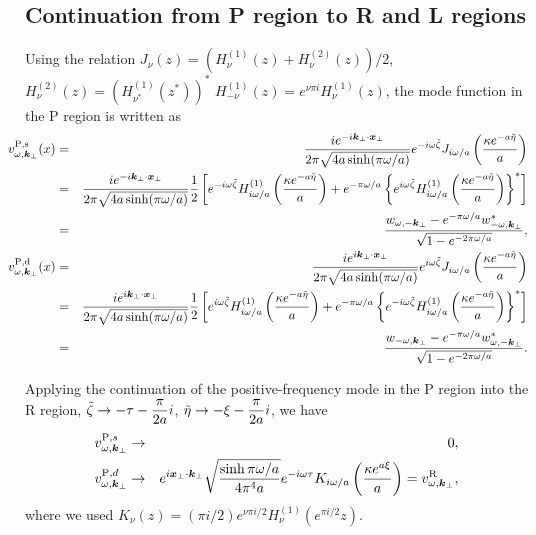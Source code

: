 \documentclass[aps,prd,preprintnumbers,nofootinbib,showpacs,11pt]{revtex4}%
\begin{document}
\begin{widetext}
\subsection{Continuation from P region to R and L regions}
Using the relation $J_\nu(z)=(H_\nu^{(1)}(z)+H_\nu^{(2)}(z))/2$, 
$H_\nu^{(2)}(z)=(H_{\nu^*}^{(1)}(z^*))^*$
$H_{-\nu}^{(1)}(z)=e^{\nu\pi i}H_\nu^{(1)}(z)$,
the mode function in the P region is written as
\begin{eqnarray}
\hspace{-5mm}
v_{\omega,{\bm k}_\perp}^{\P,\s}(x)&=&{ie^{-i\bm k_\perp\cdot \bm x_\perp}
\over 2\pi\sqrt{4a\sinh (\pi \omega/a)}}
e^{-i\omega \tilde\zeta}J_{i\omega/a}\left({\kappa e^{-a\tilde\eta}\over a}\right)
\nonumber\\
&=&{ie^{-i\bm k_\perp\cdot \bm x_\perp}
\over 2\pi\sqrt{4a\sinh (\pi \omega/a)}}
{1\over 2}\left[
e^{-i\omega \tilde\zeta}H_{i\omega/a}^{(1)}\left({\kappa e^{-a\tilde\eta}\over a}\right)
+e^{-\pi\omega/a}\left\{e^{i\omega \tilde\zeta}H_{i\omega/a}^{(1)}\left({\kappa e^{-a\tilde\eta}\over a}\right)
\right\}^*
\right]
\nonumber\\
&=&
{w_{\omega,-\bm k_\perp}-e^{-\pi\omega/a}w_{-\omega,\bm k_\perp}^*\over \sqrt{1-e^{-2\pi\omega/a}}},
\label{vps}
\\
  \hspace{-5mm}
  v_{\omega,{\bm k}_\perp}^{\P,\d}(x)&=&
{ie^{i\bm k_\perp\cdot \bm x_\perp}\over 2\pi\sqrt{4a\sinh (\pi \omega/a)}}
e^{i\omega \tilde\zeta}
J_{i\omega/a}\left({\kappa e^{-a\tilde\eta}\over a}\right)
\nonumber\\
&=&{ie^{i\bm k_\perp\cdot \bm x_\perp}\over 2\pi\sqrt{4a\sinh (\pi \omega/a)}}
{1\over 2}\left[
e^{i\omega \tilde\zeta}H_{i\omega/a}^{(1)}\left({\kappa e^{-a\tilde\eta}\over a}\right)
+e^{-\pi\omega/a}\left\{e^{-i\omega \tilde\zeta}H_{i\omega/a}^{(1)}\left({\kappa e^{-a\tilde\eta}\over a}\right)
\right\}^*
\right]
\nonumber\\
&=&
{w_{-\omega,\bm k_\perp}-e^{-\pi\omega/a}w_{\omega,-\bm k_\perp}^*\over \sqrt{1-e^{-2\pi\omega/a}}}.
\label{vpd}
\end{eqnarray}

Applying the continuation of the positive-frequency mode in the P region into the R region, 
 $\displaystyle{\tilde\zeta\rightarrow-\tau-{\pi \over 2a }i}$,
 $\displaystyle{\tilde\eta\rightarrow-\xi-{\pi \over 2a}i}$,
we have
\begin{eqnarray}
v^{{\rm P},s}_{\omega,\bm k_\perp}&\rightarrow&0,
\\
v^{{\rm P},d}_{\omega,\bm k_\perp}&\rightarrow&{e^{i\bm x_\perp\cdot\bm k_\perp}}\sqrt{\sinh\pi\omega/a\over 4\pi^4a}e^{-i\omega\tau}K_{i\omega/a} 
\left({\kappa e^{a\xi}\over a}\right)=v^{\rm R}_{\omega,\bm k_\perp},
\end{eqnarray}
where we used $K_\nu(z)=(\pi i/2)e^{\nu\pi i/2}H_\nu^{(1)}(e^{\pi i/2}z)$.


\end{widetext}
\end{document}
